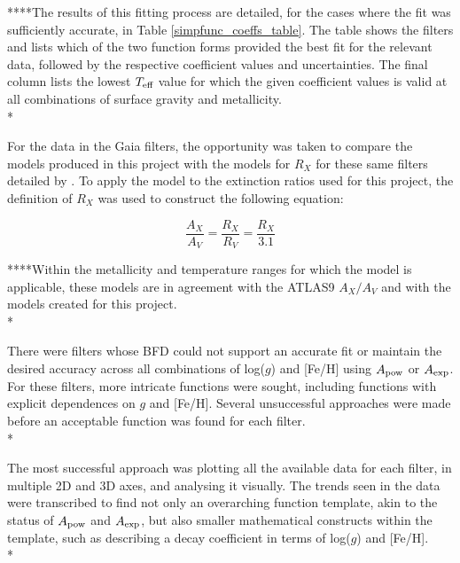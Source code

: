 \documentclass[12pt, a4paper]{report}
\begin{document}
****The results of this fitting process are detailed, for the cases where the fit was sufficiently accurate, in Table \ref{simpfunc_coeffs_table}. The table shows the filters and lists which of the two function forms provided the best fit for the relevant data, followed by the respective coefficient values and uncertainties. The final column lists the lowest $T_{\textnormal{eff}}$ value for which the given coefficient values is valid at all combinations of surface gravity and metallicity. \\*

For the data in the Gaia filters, the opportunity was taken to compare the models produced in this project with the models for $R_{X}$ for these same filters detailed by \cite{2018MNRAS.479L.102C}. To apply the \cite{2018MNRAS.479L.102C} model to the extinction ratios used for this project, the definition of $R_{X}$ was used to construct the following equation:

\begin{equation}
\frac{A_{X}}{A_{V}} = \frac{R_{X}}{R_{V}} = \frac{R_{X}}{3.1}
\label{convert_Rx_to_Ax}
\end{equation}

****Within the metallicity and temperature ranges for which the \cite{2018MNRAS.479L.102C} model is applicable, these models are in agreement with the ATLAS9 $A_{X}/A_{V}$ and with the models created for this project.\\*

There were filters whose BFD could not support an accurate fit or maintain the desired accuracy across all combinations of log($g$) and [Fe/H] using $A_{\textnormal{pow}}$ or $A_{\textnormal{exp}}$. For these filters, more intricate functions were sought, including functions with explicit dependences on $g$ and [Fe/H]. Several unsuccessful approaches were made before an acceptable function was found for each filter.\\*

The most successful approach was plotting all the available data for each filter, in multiple 2D and 3D axes, and analysing it visually. The trends seen in the data were transcribed to find not only an overarching function template, akin to the status of $A_{\textnormal{pow}}$ and $A_{\textnormal{exp}}$, but also smaller mathematical constructs within the template, such as describing a decay coefficient in terms of log($g$) and [Fe/H].\\*
\end{document}
